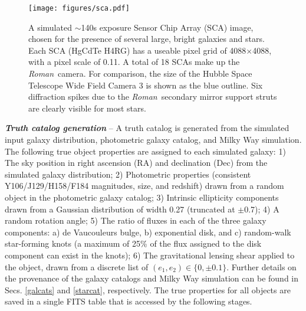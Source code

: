 \documentclass[usenatbib]{mnras}
\newcommand{\wfirst}{{\slshape Roman}}
\begin{document}
\begin{figure}
\begin{center}
\texttt{[image: figures/sca.pdf]}
\end{center}
\caption[]{
A simulated $\sim$140s exposure Sensor Chip Array (SCA) image, chosen for the presence of several large, bright galaxies and stars. Each SCA (HgCdTe H4RG) has a useable pixel grid of 4088$\times$4088, with a pixel scale of 0.11\arcsec. A total of 18 SCAs make up the \wfirst\ camera. For comparison, the size of the Hubble Space Telescope Wide Field Camera 3 is shown as the blue outline. Six diffraction spikes due to the \wfirst\ secondary mirror support struts are clearly visible for most stars.
\label{fig:sca}}
\end{figure}


\textbf{\textit{Truth catalog generation}} -- A truth catalog is generated from the simulated input galaxy distribution, photometric galaxy catalog, and Milky Way simulation. 
The following true object properties are assigned to each simulated galaxy:
1) The sky position in right ascension (RA) and declination (Dec) from the simulated galaxy distribution; 
2) Photometric properties (consistent Y106/J129/H158/F184 magnitudes, size, and redshift) drawn from a random object in the photometric galaxy catalog; 
3) Intrinsic ellipticity components drawn from a Gaussian distribution of width 0.27 (truncated at $\pm$0.7); 
4) A random rotation angle; 
5) The ratio of fluxes in each of the three galaxy components: a) de Vaucouleurs bulge, b) exponential disk, and c) random-walk star-forming knots (a maximum of 25\% of the flux assigned to the disk component can exist in the knots); 
6) The gravitational lensing shear applied to the object, drawn from a discrete list of $(e_1, e_2) \in \{0,\pm 0.1\}$.
Further details on the provenance of the galaxy catalogs and Milky Way simulation can be found in Secs. \ref{galcats} and \ref{starcat}, respectively. 
The true properties for all objects are saved in a single FITS table that is accessed by the following stages.
\end{document}
